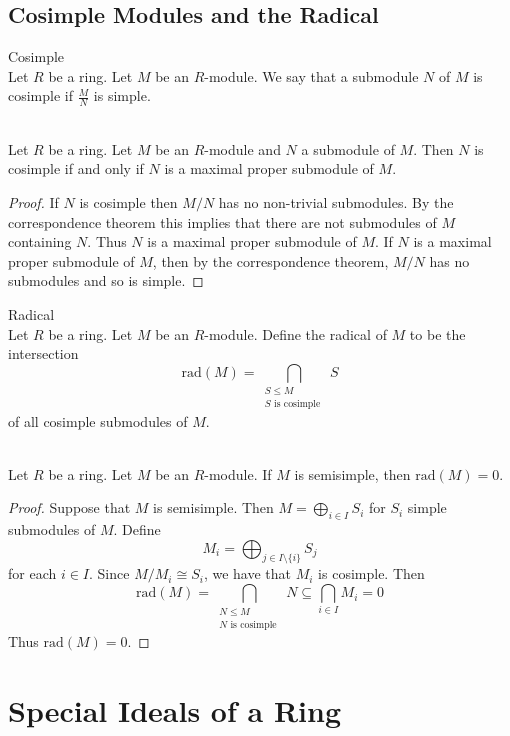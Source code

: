 \documentclass[a4paper]{article}
\begin{document}
\subsection{Cosimple Modules and the Radical}
\begin{defn}{Cosimple}{}\\
Let $R$ be a ring. Let $M$ be an $R$-module. We say that a submodule $N$ of $M$ is cosimple if $\frac{M}{N}$ is simple. 
\end{defn}

\begin{lmm}{}{}\\
Let $R$ be a ring. Let $M$ be an $R$-module and $N$ a submodule of $M$. Then $N$ is cosimple if and only if $N$ is a maximal proper submodule of $M$. 
\begin{proof}
If $N$ is cosimple then $M/N$ has no non-trivial submodules. By the correspondence theorem this implies that there are not submodules of $M$ containing $N$. Thus $N$ is a maximal proper submodule of $M$. If $N$ is a maximal proper submodule of $M$, then by the correspondence theorem, $M/N$ has no submodules and so is simple. 
\end{proof}
\end{lmm}

\begin{defn}{Radical}{}\\
Let $R$ be a ring. Let $M$ be an $R$-module. Define the radical of $M$ to be the intersection $$\text{rad}(M)=\bigcap_{\substack{S\leq M\\S\text{ is cosimple }}}S$$ of all cosimple submodules of $M$. 
\end{defn}

\begin{lmm}{}{}\\
Let $R$ be a ring. Let $M$ be an $R$-module. If $M$ is semisimple, then $\text{rad}(M)=0$. 
\begin{proof}
Suppose that $M$ is semisimple. Then $M=\bigoplus_{i\in I}S_i$ for $S_i$ simple submodules of $M$. Define $$M_i=\bigoplus_{j\in I\setminus\{i\}}S_j$$ for each $i\in I$.  Since $M/M_i\cong S_i$, we have that $M_i$ is cosimple. Then $$\text{rad}(M)=\bigcap_{\substack{N\leq M\\N\text{ is cosimple }}}N\subseteq\bigcap_{i\in I}M_i=0$$ Thus $\text{rad}(M)=0$. 
\end{proof}
\end{lmm}

\pagebreak
\section{Special Ideals of a Ring}
\end{document}
